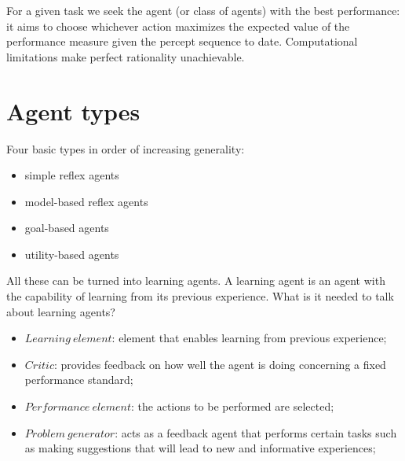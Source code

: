 \documentclass{article}
\begin{document}
For a given task we seek the agent (or class of agents) with the best performance: it aims to choose whichever action maximizes the expected value of the performance measure given the percept sequence to date.
Computational limitations make perfect rationality unachievable.

\section{Agent types}

Four basic types in order of increasing generality:

\begin{center}
    \begin{itemize}
        \item simple reflex agents
        \item model-based reflex agents
        \item goal-based agents
        \item utility-based agents
    \end{itemize}
\end{center}

All these can be turned into learning agents. A learning agent is an agent with the capability of learning from its previous experience. What is it needed to talk about learning agents?

\begin{itemize}
    \item $Learning\ element$: element that enables learning from previous experience;
    \item $Critic$: provides feedback on how well the agent is doing concerning a fixed performance standard;
    \item $Performance\ element$: the actions to be performed are selected;
    \item $Problem\ generator$: acts as a feedback agent that performs certain tasks such as making suggestions that will lead to new and informative experiences;
\end{itemize}
\end{document}
